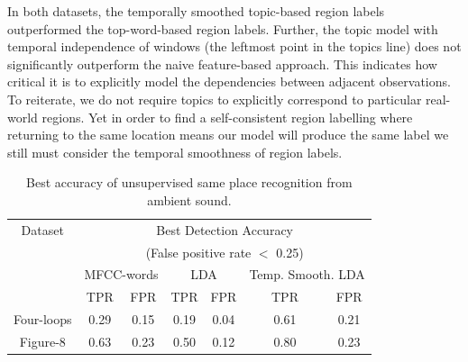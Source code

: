 In both datasets, the temporally smoothed topic-based region labels outperformed the top-word-based region labels. Further, the topic model with temporal independence of windows (the leftmost point in the topics line) does not significantly outperform the naive feature-based approach. This indicates how critical it is to explicitly model the dependencies between adjacent observations. To reiterate, we do not require topics to explicitly correspond to particular real-world regions. Yet in order to find a self-consistent region labelling where returning to the same location means our model will produce the same label we still must consider the temporal smoothness of region labels.

\begin{table}
    \centering
    \begin{tabular}{|c|c|c|c|c|c|c|}
    \hline
    Dataset & \multicolumn{6}{|c|}{Best Detection Accuracy}\\
    & \multicolumn{6}{|c|}{(False positive rate $<$ 0.25)}\\ \cline{2-7}
    &\multicolumn{2}{|c|}{MFCC-words}& \multicolumn{2}{|c|}{LDA}&\multicolumn{2}{|c|}{Temp. Smooth. LDA}\\
    \hline
    &TPR& FPR&TPR& FPR&~~ TPR ~~& FPR\\
    \hline
    Four-loops & 0.29 &0.15 & 0.19 & 0.04 & 0.61 & 0.21\\
    \hline
    Figure-8 & 0.63 & 0.23 & 0.50 & 0.12 & 0.80 & 0.23\\
    \hline
    \end{tabular}
    
    \caption{Best accuracy of unsupervised same place recognition from ambient sound.}
    \label{tab:audio-results-summary}
\end{table}

